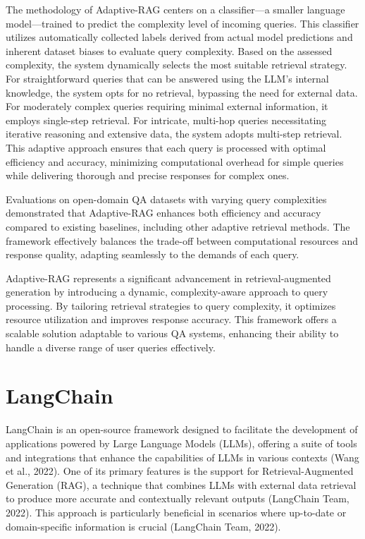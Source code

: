 The methodology of Adaptive-RAG centers on a classifier—a smaller language model—trained to predict the complexity level of incoming queries. This classifier utilizes automatically collected labels derived from actual model predictions and inherent dataset biases to evaluate query complexity. Based on the assessed complexity, the system dynamically selects the most suitable retrieval strategy. For straightforward queries that can be answered using the LLM's internal knowledge, the system opts for no retrieval, bypassing the need for external data. For moderately complex queries requiring minimal external information, it employs single-step retrieval. For intricate, multi-hop queries necessitating iterative reasoning and extensive data, the system adopts multi-step retrieval. This adaptive approach ensures that each query is processed with optimal efficiency and accuracy, minimizing computational overhead for simple queries while delivering thorough and precise responses for complex ones.

Evaluations on open-domain QA datasets with varying query complexities demonstrated that Adaptive-RAG enhances both efficiency and accuracy compared to existing baselines, including other adaptive retrieval methods. The framework effectively balances the trade-off between computational resources and response quality, adapting seamlessly to the demands of each query.

Adaptive-RAG represents a significant advancement in retrieval-augmented generation by introducing a dynamic, complexity-aware approach to query processing. By tailoring retrieval strategies to query complexity, it optimizes resource utilization and improves response accuracy. This framework offers a scalable solution adaptable to various QA systems, enhancing their ability to handle a diverse range of user queries effectively.


\section{LangChain}

\noindent LangChain is an open-source framework designed to facilitate the development of applications powered by Large Language Models (LLMs), offering a suite of tools and integrations that enhance the capabilities of LLMs in various contexts (Wang et al., 2022). One of its primary features is the support for Retrieval-Augmented Generation (RAG), a technique that combines LLMs with external data retrieval to produce more accurate and contextually relevant outputs (LangChain Team, 2022). This approach is particularly beneficial in scenarios where up-to-date or domain-specific information is crucial (LangChain Team, 2022).

